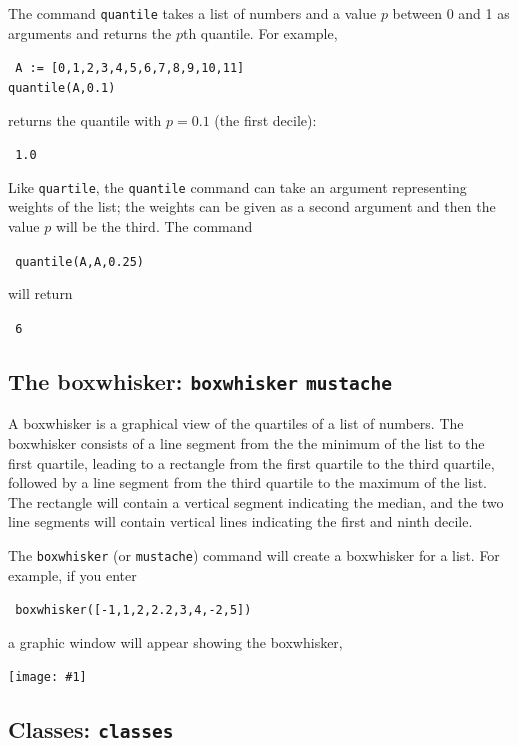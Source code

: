 \documentclass[a4paper,11pt]{book}
\newcommand{\includeimage}[1]
{\texttt{[image: \#1]}}
\begin{document}
The command \texttt{quantile} takes a list of numbers and a value $p$
between 0 and 1 as arguments and returns the $p$th quantile.  For
example,
\begin{center}
  \tt
  A := [0,1,2,3,4,5,6,7,8,9,10,11]\\
  quantile(A,0.1)
\end{center}
returns the quantile with $p = 0.1$ (the first decile):
\begin{center}
  \tt
  1.0
\end{center}

Like \texttt{quartile}, the \texttt{quantile} command can take an
argument representing weights of the list; the weights can be given as
a second argument and then the value $p$ will be the third.  The command
\begin{center}
  \tt
  quantile(A,A,0.25)
\end{center}
will return
\begin{center}
  \tt
  6
\end{center}

\subsection{The boxwhisker: \texttt{boxwhisker} \texttt{mustache}}

A boxwhisker is a graphical view of the quartiles of a list of numbers.
The boxwhisker consists of a line segment from the the minimum of the
list to the first quartile, leading to a rectangle from the first
quartile to the third quartile, followed by a line segment from the
third quartile to the maximum of the list.  The rectangle will contain
a vertical segment indicating the median, and the two line segments
will contain vertical lines indicating the first and ninth decile.

The \texttt{boxwhisker} (or \texttt{mustache}) command will create a
boxwhisker for a list.  For example, if you enter
\begin{center}
  \tt
  boxwhisker([-1,1,2,2.2,3,4,-2,5])
\end{center}
a graphic window will appear showing the boxwhisker,
\begin{center}
  \includeimage{xcas-boxwhisker.png}
\end{center}

\subsection{Classes: \texttt{classes}}
\end{document}
